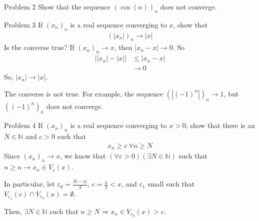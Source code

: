 \documentclass[8pt]{extarticle}
\newcommand{\N}{\mathbb{N}}
\begin{document}
  \begin{problem}{Problem 2}
    Show that the sequence $(\cos(n))_n$ does not converge.
  \end{problem}
  \begin{problem}{Problem 3}
    If $(x_n)_n$ is a real sequence converging to $x$, show that
    \begin{align*}
      (|x_n|)_n \rightarrow |x|
    \end{align*}
    Is the converse true?
    \tcblower
    If $(x_n)_n \rightarrow x$, then $|x_n - x| \rightarrow 0$. So
    \begin{align*}
      \left||x_n|-|x|\right| &\leq |x_n - x| \tag*{Reverse Triangle Inequality}\\
                  &\rightarrow 0
    \end{align*}
    So, $|x_n| \rightarrow |x|$.\newline

    The converse is not true. For example, the sequence $\left(|(-1)^n|\right)_n \rightarrow 1$, but $\left((-1)^n\right)_n$ does not converge.
  \end{problem}
  \begin{problem}{Problem 4}
    If $(x_n)_n$ is a real sequence converging to $x > 0$, show that there is an $N\in\N$ and $c > 0$ such that
    \begin{align*}
      x_n \geq c~\forall n\geq N
    \end{align*}
    \tcblower
    Since $(x_n)_n \rightarrow x$, we know that $(\forall \varepsilon > 0)(\exists N\in\N)$ such that $n\geq n \rightarrow x_n\in V_{\varepsilon}(x)$.\newline

    In particular, let $\varepsilon_0 = \frac{|0-x|}{3}$, $c = \frac{x}{3} < x$, and $\varepsilon_1$ small such that $V_{\varepsilon_1}(c) \cap V_{\varepsilon_0}(x) = \emptyset$.\newline

    Then, $\exists N\in\N$ such that $n\geq N \Rightarrow x_n\in V_{\varepsilon_0}(x) > c$.
  \end{problem}
\end{document}
